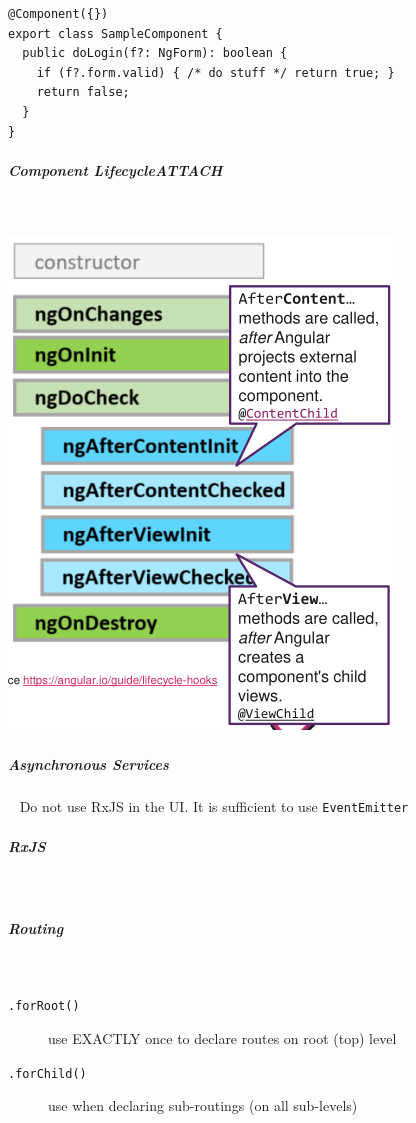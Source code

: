 \documentclass[11pt,twoside,landscape]{article}
\begin{document}
\begin{multicols}{3}
{
\begin{verbatim}
@Component({})
export class SampleComponent {
  public doLogin(f?: NgForm): boolean {
    if (f?.form.valid) { /* do stuff */ return true; }
    return false;
  }
}
\end{verbatim}
\label{lst:angular-form-logic}
}
\subparagraph{Component Lifecycle\hfill{}\textsc{ATTACH}} \
\label{sec:orgf16968a}
{
\begin{center}
\includegraphics[width=.9\linewidth]{img/component_lifecycle.png}
\end{center}
\label{fig:component-lifecycle}
}
\subparagraph{Asynchronous Services} \
\label{sec:org90e1388}
Do not use RxJS in the UI.
It is sufficient to use \texttt{EventEmitter}
\subparagraph{RxJS} \
\label{sec:org1a53b43}
\subparagraph{Routing} \
\label{sec:org89333ea}
\begin{description}
\item[{\texttt{.forRoot()}}] use EXACTLY once to declare routes on root (top) level
\item[{\texttt{.forChild()}}] use when declaring sub-routings (on all sub-levels)

\end{description}
\end{multicols}
\end{document}
